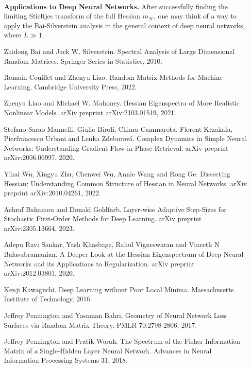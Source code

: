 \documentclass{article}
\begin{document}
\bigskip
\bigskip
\\
\textbf{Applications to Deep Neural Networks.} After successfully finding the limiting Stieltjes transform of the full Hessian $m_{\mathcal{H}}$, one may think of a way to apply the Bai-Silverstein analysis in the general context of deep neural networks, where $L\gg1$.







\newpage
\begin{thebibliography}{9}
Zhidong Bai and Jack W. Silverstein. Spectral Analysis of Large Dimensional Random Matrices. Springer Series in Statistics, 2010.

Romain Couillet and Zhenyu Liao. Random Matrix Methods for Machine Learning. Cambridge University Press, 2022. 

Zhenyu Liao and Michael W. Mahoney. Hessian Eigenspectra of More Realistic Nonlinear Models. arXiv preprint arXiv:2103.01519, 2021.

Stefano Sarao Mannelli, Giulio Biroli, Chiara Cammarota, Florent Krzakala, Pierfrancesco Urbani and Lenka Zdeborová. Complex Dynamics in Simple Neural Networks: Understanding Gradient Flow in Phase Retrieval. arXiv preprint arXiv:2006.06997, 2020.

Yikai Wu, Xingyu Zhu, Chenwei Wu, Annie Wang and Rong Ge. Dissecting Hessian: Understanding Common Structure of Hessian in Neural Networks. arXiv preprint arXiv:2010.04261, 2022.

Achraf Bahamou and Donald Goldfarb. Layer-wise Adaptive Step-Sizes for Stochastic First-Order Methods for Deep Learning. arXiv preprint arXiv:2305.13664, 2023.

Adepu Ravi Sankar, Yash Khasbage, Rahul Vigneswaran and Vineeth N Balasubramanian. A Deeper Look at the Hessian Eigenspectrum of Deep Neural Networks and its Applications to Regularization. arXiv preprint arXiv:2012.03801, 2020.

Kenji Kawaguchi. Deep Learning without Poor Local Minima. Massachusetts Institute of Technology, 2016. 

Jeffrey Pennington and Yasaman Bahri. Geometry of Neural Network Loss Surfaces via Random Matrix Theory. PMLR 70:2798-2806, 2017.

Jeffrey Pennington and Pratik Worah. The Spectrum of the Fisher Information Matrix of a Single-Hidden Layer Neural Network. Advances in Neural Information Processing Systems 31, 2018.


\end{thebibliography}
\end{document}
